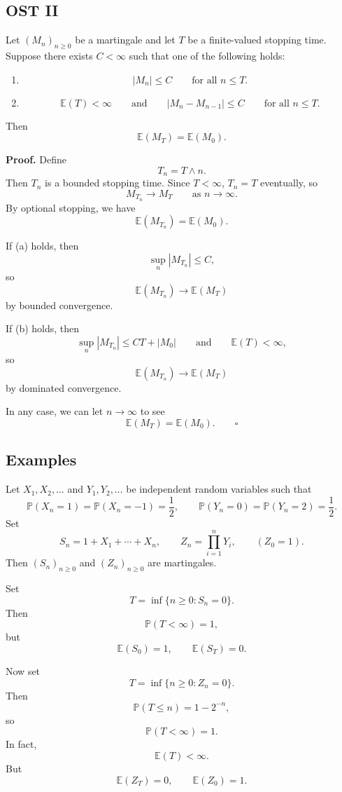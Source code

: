 \documentclass[11pt,a4paper]{article}
\begin{document}
\subsection*{OST II}

Let $(M_n)_{n\geq 0}$ be a martingale and let $T$ be a finite-valued stopping time.
Suppose there exists $C<\infty$ such that one of the following holds:
\begin{enumerate}
    \item[(a)]
    \[
    |M_n|\leq C
    \qquad\text{for all }n\leq T.
    \]

    \item[(b)]
    \[
    \mathbb{E}(T)<\infty
    \qquad\text{and}\qquad
    |M_n-M_{n-1}|\leq C
    \qquad\text{for all }n\leq T.
    \]
\end{enumerate}
Then
\[
\mathbb{E}(M_T)=\mathbb{E}(M_0).
\]

\noindent\textbf{Proof.}
Define
\[
T_n=T\wedge n.
\]
Then $T_n$ is a bounded stopping time.
Since $T<\infty$, $T_n=T$ eventually, so
\[
M_{T_n}\longrightarrow M_T
\qquad\text{as }n\longrightarrow\infty.
\]
By optional stopping, we have
\[
\mathbb{E}(M_{T_n})=\mathbb{E}(M_0).
\]

If (a) holds, then
\[
\sup_n |M_{T_n}|\leq C,
\]
so
\[
\mathbb{E}(M_{T_n})\longrightarrow\mathbb{E}(M_T)
\]
by bounded convergence.

If (b) holds, then
\[
\sup_n |M_{T_n}|\leq CT+|M_0|
\qquad\text{and}\qquad
\mathbb{E}(T)<\infty,
\]
so
\[
\mathbb{E}(M_{T_n})\longrightarrow\mathbb{E}(M_T)
\]
by dominated convergence.

In any case, we can let $n\longrightarrow\infty$ to see
\[
\mathbb{E}(M_T)=\mathbb{E}(M_0).
\qquad\square
\]

\subsection*{Examples}

Let $X_1,X_2,\ldots$ and $Y_1,Y_2,\ldots$ be independent random variables such that
\[
\mathbb{P}(X_n=1)=\mathbb{P}(X_n=-1)=\frac12,
\qquad
\mathbb{P}(Y_n=0)=\mathbb{P}(Y_n=2)=\frac12.
\]
Set
\[
S_n=1+X_1+\cdots+X_n,
\qquad
Z_n=\prod_{i=1}^{n}Y_i,
\qquad
(Z_0=1).
\]
Then $(S_n)_{n\geq 0}$ and $(Z_n)_{n\geq 0}$ are martingales.

Set
\[
T=\inf\{n\geq 0:S_n=0\}.
\]
Then
\[
\mathbb{P}(T<\infty)=1,
\]
but
\[
\mathbb{E}(S_0)=1,
\qquad
\mathbb{E}(S_T)=0.
\]

Now set
\[
T=\inf\{n\geq 0:Z_n=0\}.
\]
Then
\[
\mathbb{P}(T\leq n)=1-2^{-n},
\]
so
\[
\mathbb{P}(T<\infty)=1.
\]
In fact,
\[
\mathbb{E}(T)<\infty.
\]
But
\[
\mathbb{E}(Z_T)=0,
\qquad
\mathbb{E}(Z_0)=1.
\]
\end{document}
